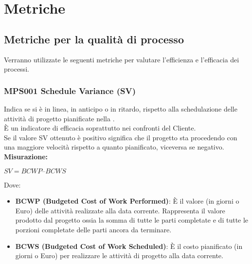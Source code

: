 \documentclass[NormeDiProgetto.tex]{subfiles}
\begin{document}
\chapter{Metriche}
\section{Metriche per la qualità di processo} 
Verranno utilizzate le seguenti metriche per valutare l'efficienza e l'efficacia dei processi.

\subsection{MPS001 Schedule Variance (SV)}
Indica se si è in linea, in anticipo o in ritardo, rispetto alla schedulazione delle attività di progetto pianificate nella .\\
È un indicatore di efficacia soprattutto nei confronti del Cliente. \\
Se il valore SV ottenuto è positivo significa che il progetto sta procedendo con una maggiore velocità rispetto a quanto pianificato, viceversa se negativo.\\
\textbf{Misurazione:}
\begin{center}
	$ SV = BCWP – BCWS $
\end{center}
Dove: \begin{itemize}
	\item \textbf{BCWP (Budgeted Cost of Work Performed)}: \`{E} il valore (in giorni o Euro) delle attività realizzate alla data corrente.
	Rappresenta il valore prodotto dal progetto ossia la somma di tutte le parti completate e di tutte le porzioni completate delle parti ancora da terminare.
	\item \textbf{BCWS (Budgeted Cost of Work Scheduled)}: \`{E} il costo pianificato (in giorni o Euro) per realizzare le attività di progetto alla data corrente.
\end{itemize}
\end{document}
